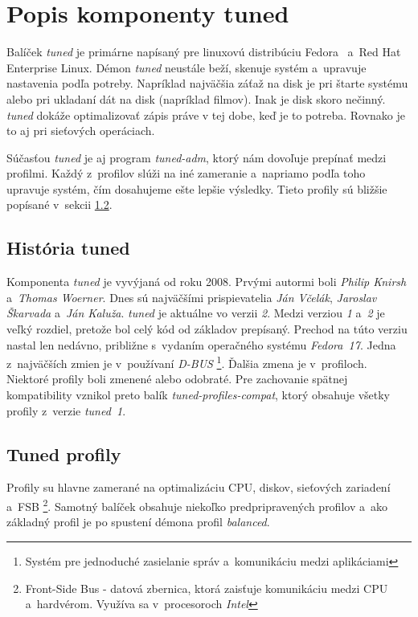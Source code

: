 %
%

\chapter{Popis komponenty tuned}

Balíček \emph{tuned} je primárne napísaný pre linuxovú distribúciu
Fedora~\cite{fedoraHomepage} a~Red Hat Enterprise Linux. Démon \emph{tuned} neustále
beží, skenuje systém a~upravuje nastavenia podľa potreby. Napríklad najväčšia
záťaž na disk je pri štarte systému alebo pri ukladaní dát na disk (napríklad
filmov). Inak je disk skoro nečinný. \emph{tuned} dokáže optimalizovať zápis práve v
tej dobe, keď je to potreba. Rovnako je to aj pri sieťových operáciach.

Súčasťou \emph{tuned} je aj program \emph{tuned-adm}, ktorý nám dovoľuje
prepínať medzi profilmi. Každý z~profilov slúži na iné zameranie a~napriamo
podľa toho upravuje systém, čím dosahujeme ešte lepšie výsledky. Tieto profily
sú bližšie popísané v~sekcii \ref{sec:profiles}.

%
%

\section{História tuned}
\label{sec:historiaTuned}

Komponenta \emph{tuned} je vyvýjaná od roku 2008. Prvými autormi boli
\emph{Philip Knirsh} a~\emph{Thomas Woerner}. Dnes sú najväčšími prispievatelia
\emph{Ján Včelák}, \emph{Jaroslav Škarvada} a~\emph{Ján Kaluža}.  \emph{tuned}
je aktuálne vo verzii \emph{2}. Medzi verziou \emph{1} a~\emph{2} je veľký
rozdiel, pretože bol celý kód od základov prepísaný. Prechod na túto verziu
nastal len nedávno, približne s~vydaním operačného systému \emph{Fedora~17}.
Jedna z~najväčších zmien je v~používaní \emph{D-BUS} \footnote{Systém pre
jednoduché zasielanie správ a~komunikáciu medzi aplikáciami}. Ďalšia zmena je
v~profiloch. Niektoré profily boli zmenené alebo odobraté. Pre zachovanie
spätnej kompatibility vznikol preto balík \emph{tuned-profiles-compat}, ktorý
obsahuje všetky profily z~verzie \emph{tuned~1}.

%
%

\section{Tuned profily}
\label{sec:profiles}

Profily su hlavne zamerané na optimalizáciu CPU, diskov, sieťových zariadení
a~FSB \footnote{Front-Side Bus - datová zbernica, ktorá zaisťuje komunikáciu
medzi CPU a~hardvérom. Využíva sa v~procesoroch \emph{Intel}}. Samotný balíček
obsahuje niekoľko predpripravených profilov a~ako základný profil je po spustení
démona profil \emph{balanced}.


